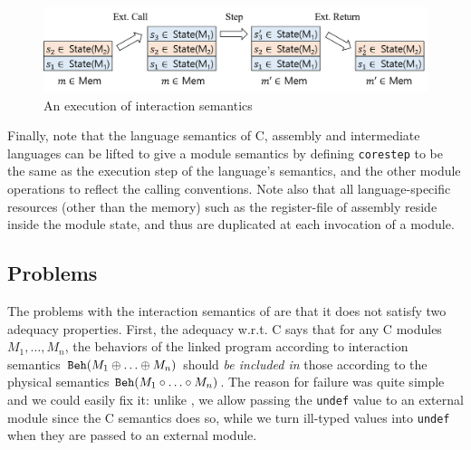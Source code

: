\begin{figure}[t]
\includegraphics[width=0.9\linewidth]{images/intersem.png}
\caption{An execution of interaction semantics}
\label{fig:inter-sem}
\end{figure}


Finally, note that the language semantics of C, assembly and
intermediate languages can be lifted to give a module semantics by
defining \texttt{corestep} to be the same as the execution step of the
language's semantics, and the other module operations to reflect the
calling conventions. Note also that all language-specific resources
(\ie other than the memory)
such as the register-file of assembly 
reside inside the module state, and thus are
duplicated at each invocation of a module.


\subsection{Problems}
\label{sec:overview-semantics:problems}

The problems with the interaction semantics of \ccc{} are that it does
not satisfy two adequacy properties. First, the adequacy w.r.t. C says
that for any C modules $M_1,\ldots,M_n$, the behaviors of the linked
program according to interaction semantics $\mathtt{Beh}({M_1 \oplus
  \ldots \oplus M_n})$ should \emph{be included in} those according to the
physical semantics $\mathtt{Beh}({M_1 \circ \ldots\circ M_n})$.  The reason for
failure was quite simple and we could easily fix it: unlike \ccc{}, we allow passing
the \texttt{undef} value to an external module since the C semantics
does so, while we turn ill-typed values into \texttt{undef} when they
are passed to an external module.


